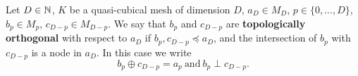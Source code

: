 \begin{definition}
  Let
    $D \in \mathbb{N}$,
    $K$ be a quasi-cubical mesh of dimension $D$,
    $a_D \in M_D$,
    $p \in \{0, ..., D\}$,
    $b_p \in M_p$,
    $c_{D - p} \in M_{D - p}$.
  We say that $b_p$ and $c_{D - p}$ are \textbf{topologically orthogonal}
  with respect to $a_D$ if $b_p, c_{D - p} \preceq a_D$, and the intersection of
  $b_p$ with $c_{D - p}$ is a node in $a_D$.
  In this case we write
  \begin{equation}
    b_p \oplus c_{D - p} = a_p\
    \text{and}\
    b_p \perp c_{D - p}.
  \end{equation}
\end{definition}
